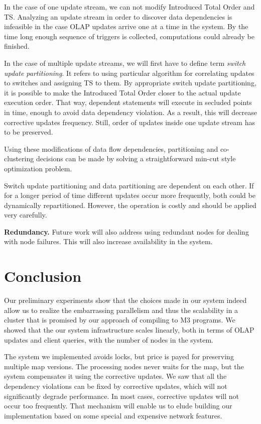 \documentclass{sig-semester}
\def\OLAP{OLAP\xspace}
\def\EXORD{actual update execution order\xspace}
\begin{document}
In the case of one update stream, we can not modify Introduced Total Order and TS. Analyzing an update stream in order to discover data dependencies is infeasible in the case \OLAP updates arrive one at a time in the system. By the time long enough sequence of triggers is collected, computations could already be finished.

In the case of multiple update streams, we will first have to define term \textit{switch update partitioning}. It refers to using particular algorithm for correlating updates to switches and assigning TS to them. By appropriate switch update partitioning, it is possible to make the Introduced Total Order closer to the \EXORD. That way, dependent statements will execute in secluded points in time, enough to avoid data dependency violation. As a result, this will decrease corrective updates frequency. Still, order of updates inside one update stream has to be preserved.

Using these modifications of data flow dependencies, partitioning and co-clustering decisions can be made by solving a straightforward min-cut style optimization problem.

Switch update partitioning and data partitioning are dependent on each other. If for a longer period of time different updates occur more frequently, both could be dynamically repartitioned. However, the operation is costly and should be applied very carefully.

\textbf{Redundancy.} Future work will also address using redundant nodes for dealing with node failures. This will also increase availability in the system.

\section{Conclusion}
\label{sec:Conclusion}
\vspace{2mm}

Our preliminary experiments show that the choices made in our
system indeed allow us to realize the embarrassing parallelism and
thus the scalability in a cluster that is promised by our approach of
compiling to M3 programs.  We showed that the our system infrastructure scales linearly, both in terms of \OLAP updates and client queries, with the number of nodes in the system.

The system we implemented avoids locks, but price is payed for preserving multiple map versions. The processing nodes never waits for the map, but the system compensates it using the corrective updates. We saw that all the dependency violations can be fixed by corrective updates, which will not significantly degrade performance. In most cases, corrective updates will not occur too frequently. That mechanism will enable us to elude building our implementation based on some special and expensive network features.

{


}

\newpage
\end{document}

